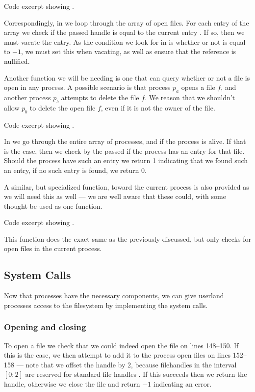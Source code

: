 {Code excerpt showing .}

Correspondingly, in  we loop through the
array of open files. For each entry of the array we check if the passed handle
is equal to the current entry . If so, then we must vacate
the entry. As the condition we look for in  is
whether or not  is equal to $-1$, we must set this when
vacating, as well as ensure that the  reference is nullified.

\newpage
Another function we will be needing is one that can query whether or not a
file is open in any process. A possible scenario is that process $p_a$ opens a
file $f$, and another process $p_b$ attempts to delete the file $f$. We reason
that we shouldn't allow $p_b$ to delete the open file $f$, even if it is not
the owner of the file.

{Code excerpt showing .}

In  we go through the entire array of processes,
and if the process is alive. If that is the case, then we check by the passed
 if the process has an entry for that file. Should the process
have such an entry we return 1 indicating that we found such an entry, if no
such entry is found, we return 0.

A similar, but specialized function, toward the current process is also
provided as we will need this as well --- we are well aware that these could,
with some thought be used as one function.

{Code excerpt showing .}

This function does the exact same as the previously discussed, but only checks
for open files in the current process.

\newpage
\subsection{System Calls}
Now that processes have the necessary components, we can give userland
processes access to the filesystem by implementing the system calls.

\subsubsection{Opening and closing}
To open a file we check that we could indeed open the file on lines 148--150.
If this is the case, we then attempt to add it to the process open files on
lines 152--158 --- note that we offset the handle by 2, because filehandles in
the interval $[0;2]$ are reserved for standard file handles
. If this succeeds then we return the handle,
otherwise we close the file and return $-1$ indicating an error.

